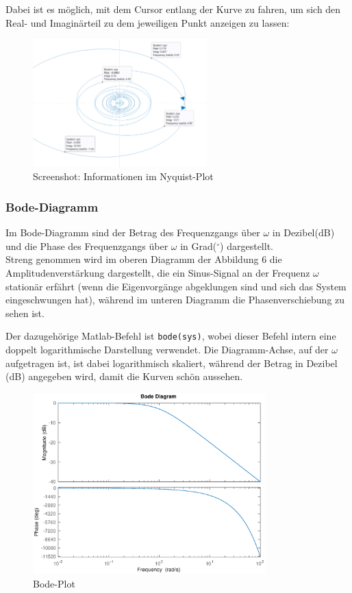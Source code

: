  Dabei ist es möglich, mit dem Cursor entlang der Kurve zu fahren, um sich den Real- und Imaginärteil zu dem jeweiligen Punkt anzeigen zu lassen:
 \begin{figure}[H]
    \label{fig:nyquistCursor}
    \centering
    \includegraphics[width=0.6\textwidth]{Bilder/NyquistCursorPT1Tt.png}
    \caption{Screenshot: Informationen im Nyquist-Plot}
 \end{figure}

 
\subsubsection{Bode-Diagramm}
Im Bode-Diagramm sind der Betrag des Frequenzgangs über $\omega$ in Dezibel(dB) und die Phase des Frequenzgangs über $\omega$ in Grad($^\circ$) dargestellt.\\
Streng genommen wird im oberen Diagramm der Abbildung 6 die Amplitudenverstärkung dargestellt, die ein Sinus-Signal an der Frequenz $\omega$ stationär erfährt (wenn die Eigenvorgänge abgeklungen sind und sich das System eingeschwungen hat), während im unteren Diagramm die Phasenverschiebung zu sehen ist.  

Der dazugehörige Matlab-Befehl ist \texttt{bode(sys)}, wobei dieser Befehl intern eine doppelt logarithmische Darstellung verwendet. Die Diagramm-Achse, auf der $\omega$ aufgetragen ist, ist dabei logarithmisch skaliert, während der Betrag in Dezibel (dB) angegeben wird,  damit die Kurven schön aussehen.

\begin{figure}[H]
    \label{fig:bodePlot}
    \label{fig:lassmich}
    \centering
    \includegraphics[width=0.8\textwidth]{Bilder/BodePT1Tt.eps}
    \caption{Bode-Plot}
 \end{figure}

